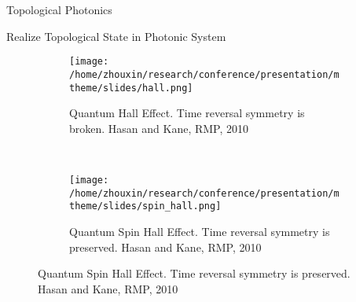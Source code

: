 \documentclass{beamer}
\newenvironment{variableblock}[3]{%
  \setbeamercolor{block body}{#2}
  \setbeamercolor{block title}{#3}
  \begin{block}{#1}}{\end{block}}
\begin{document}
\begin{frame}{Topological Photonics}
\begin{block}{Realize Topological State in Photonic System}

\begin{figure}
    \centering
    \begin{subfigure}[t]{0.4\textwidth}
        \texttt{[image: /home/zhouxin/research/conference/presentation/mtheme/slides/hall.png]}
        \caption{Quantum Hall Effect. Time reversal symmetry is broken. Hasan and Kane, RMP, 2010}
        \label{fig:gull}
    \end{subfigure}\hspace*{3.0em}%
    ~ %
    \begin{subfigure}[t]{0.415\textwidth}
        \texttt{[image: /home/zhouxin/research/conference/presentation/mtheme/slides/spin\_hall.png]}
        \caption{Quantum Spin Hall Effect. Time reversal symmetry is preserved. Hasan and Kane, RMP, 2010}
        \label{fig:tiger}
    \end{subfigure}
\label{fig:animals}
\end{figure}      


\end{block}

\end{frame}
\end{document}
